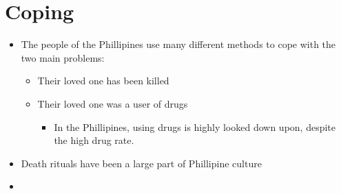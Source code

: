 \documentclass[../../main.tex]{subfiles}
\begin{document}
\section{Coping}
\begin{itemize}
    \item The people of the Phillipines use many different methods to cope with the two main problems:
    \begin{itemize}
        \item Their loved one has been killed
        \item Their loved one was a user of drugs
        \begin{itemize}
            \item In the Phillipines, using drugs is highly looked down upon, despite the high drug rate.
        \end{itemize}
    \end{itemize}
    \item Death rituals have been a large part of Phillipine culture
    \item 
\end{itemize}
\end{document}
